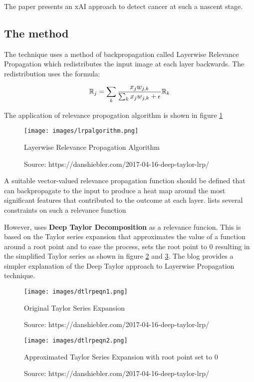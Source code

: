 \documentclass[sigconf, language=english]{acmart}
\begin{document}
The paper \cite{insitu2021} presents an xAI approach to detect cancer at such a nascent stage.

\subsection{The method}

The technique uses a method of backpropagation called Layerwise Relevance Propagation which redistributes the input image at each layer backwards. The redistribution uses the formula:

\begin{equation}
\mathbb{R}_{j} = \sum_{k} \frac{x_j w_{j,k}}{\sum_k x_j w_{j,k} + \epsilon} \mathbb{R}_{k}
\end{equation}

The application of relevance propogation algorithm is shown in figure \ref{relevance}

\begin{figure} [ht]
  \centering
  \texttt{[image: images/lrpalgorithm.png]}
    \caption{Layerwise Relevance Propagation Algorithm}
    \caption*{Source: https://danshiebler.com/2017-04-16-deep-taylor-lrp/}
  \label{relevance}
\end{figure}

A suitable vector-valued relevance propagation function should be defined that can backpropagate to the input to produce a heat map around the most significant features that contributed to the outcome at each layer. \cite{bach2015} lists several constraints on such a relevance function

However, \cite{insitu2021} uses \textbf{Deep Taylor Decomposition} as a relevance funcion. This is based on the Taylor series expansion that approximates the value of a function around a root point and to ease the process, sets the root point to 0 resulting in the simplified Taylor series as shown in figure \ref{taylor1} and \ref{taylor2}. The blog \cite{schiebler17} provides a simpler explanation of the Deep Taylor approach to Layerwise Propagation technique.
\begin{figure} [ht]
  \centering
  \texttt{[image: images/dtlrpeqn1.png]}
    \caption{Original Taylor Series Expansion}
    \caption*{Source: https://danshiebler.com/2017-04-16-deep-taylor-lrp/}
  \label{taylor1}
\end{figure}
\begin{figure} [ht]
  \centering
  \texttt{[image: images/dtlrpeqn2.png]}
    \caption{Approximated Taylor Series Expansion with root point set to 0}
    \caption*{Source: https://danshiebler.com/2017-04-16-deep-taylor-lrp/}
  \label{taylor2}
\end{figure}
\end{document}
